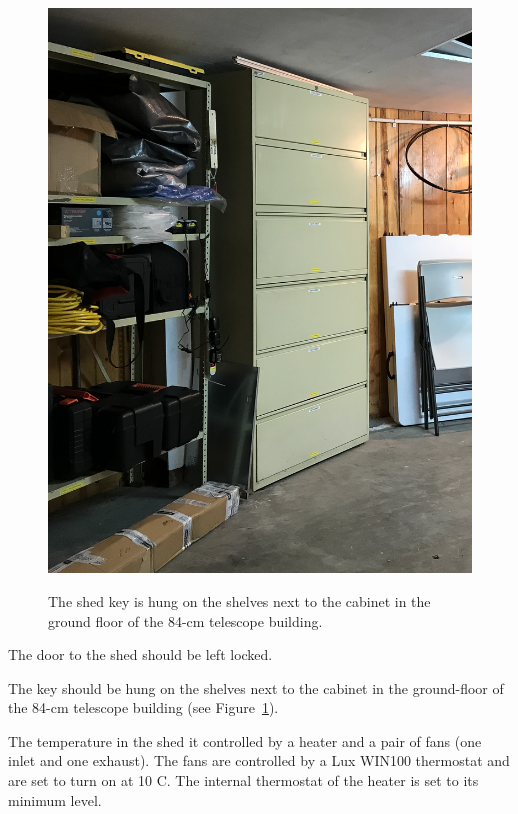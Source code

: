 \begin{figure}
\begin{center}
\begin{labeled}{\includegraphics[width=0.8\linewidth]{figures/buildings-shed-key.jpg}}
\end{labeled}
\end{center}
\caption{The shed key is hung on the shelves next to the cabinet in the ground floor of the 84-cm telescope building.}
\label{figure:buildings-shed-key}
\end{figure}

The door to the shed should be left locked. 

The key should be hung on the shelves next to the cabinet in the ground-floor of the 84-cm telescope building (see Figure~\ref{figure:buildings-shed-key}).

The temperature in the shed it controlled by a heater and a pair of fans (one inlet and one exhaust). The fans are controlled by a Lux WIN100 thermostat and are set to turn on at 10 C. The internal thermostat of the heater is set to its minimum level.


